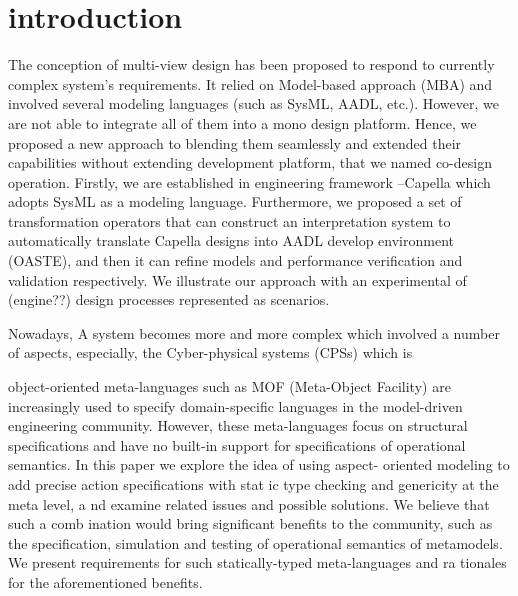 \section{introduction}
The conception of multi-view design has been proposed to respond to currently complex system's requirements. It relied on Model-based approach (MBA) and involved several modeling languages (such as SysML, AADL, etc.). However, we are not able to integrate all of them into a mono design platform. Hence, we proposed a new approach to blending them seamlessly and extended their capabilities without extending development platform, that we named co-design operation. Firstly, we are established in engineering framework --Capella which adopts SysML as a modeling language. Furthermore, we proposed a set of transformation operators that can construct an interpretation system to automatically translate  Capella designs into AADL develop environment (OASTE), and then it can refine models and performance verification and validation respectively. We illustrate our approach with an experimental of (engine??) design processes represented as scenarios.


Nowadays, A system becomes more and more complex which involved a number of aspects, especially, the Cyber-physical systems (CPSs) which is 


object-oriented  meta-languages such as MOF (Meta-Object Facility) are increasingly used to  specify domain-specific languages in  the   model-driven   engineering   community.   However,   these   meta-languages focus on structural specifications and have no built-in support for specifications 
of  operational  semantics.  In  this  paper  
we  explore  the  idea  of  using  aspect-
oriented modeling to add precise action specifications with stat
ic type checking 
and  genericity  at  the  meta  level,  a
nd  examine  related  issues  and  possible  
solutions. We believe that such a comb
ination would bring significant benefits 
to   the   community,   such   as   the   specification,   simulation   and   testing   of   
operational   semantics   of   
metamodels.   We   present   requirements   for   such   
statically-typed meta-languages and ra
tionales for the aforementioned benefits. 